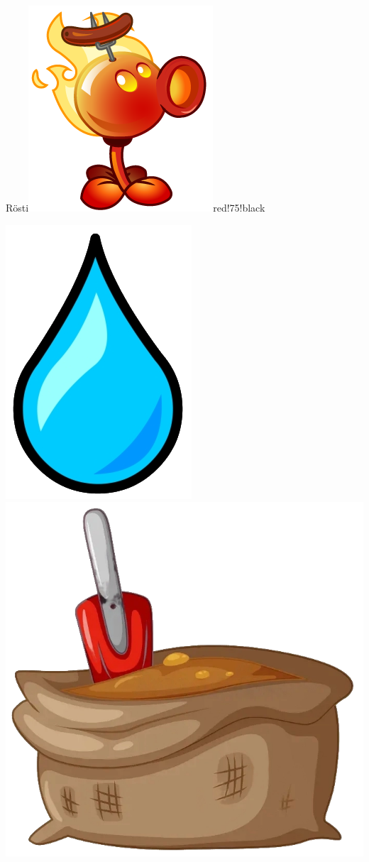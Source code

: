 \documentclass[11pt, a5paper]{article}
\def\now{\hspace{0.2cm}}
\begin{document}
\begin{mybox}{Rösti}{\includegraphics[scale=0.1]{fire}}{red!75!black}
\begin{minipage}[t]{\textwidth}
			\now\includegraphics[scale=0.3]{water} 
			\now\includegraphics[scale=0.04]{dirt} 

\end{minipage}
\end{mybox}
\end{document}
